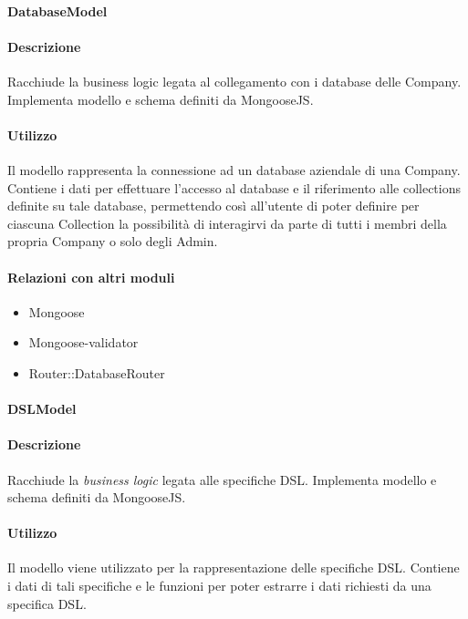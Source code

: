 \paragraph{DatabaseModel}
\paragraph*{Descrizione}

Racchiude la business logic legata al collegamento con i database delle Company. Implementa modello e schema definiti da MongooseJS.

\paragraph*{Utilizzo}
Il modello rappresenta la connessione ad un database aziendale di una Company. Contiene i dati per effettuare l'accesso al database e il riferimento alle collections definite su tale database, permettendo così all'utente di poter definire per ciascuna Collection la possibilità di interagirvi da parte di tutti i membri della propria Company o solo degli Admin.

\paragraph*{Relazioni con altri moduli}
\begin{itemize}
\item Mongoose
\item Mongoose-validator
\item Router::DatabaseRouter
\end{itemize}

\paragraph{DSLModel}
\paragraph*{Descrizione}

Racchiude la \textit{business logic} legata alle specifiche DSL. Implementa modello e schema definiti da MongooseJS.

\paragraph*{Utilizzo}
Il modello viene utilizzato per la rappresentazione delle specifiche DSL. Contiene i dati di tali specifiche e le funzioni per poter estrarre i dati richiesti da una specifica DSL.

